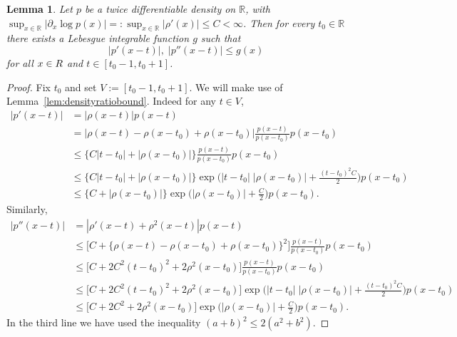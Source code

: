 \documentclass[aos]{imsart}
\newcommand{\R}{\mathbb{R}}
\newtheorem{lemma}[theorem]{Lemma}
\begin{document}
	\begin{lemma}
		\label{lem:pderivlocallybounded}
		Let $p$ be a twice differentiable density on $\R$, with $\sup_{x\in\R} |\partial_x \log p(x)| =: \sup_{x\in\R} |\rho'(x)|\leq C<\infty$. Then for every $t_0\in\R$ there exists a Lebesgue integrable function $g$ such that 
		\begin{equation*}
			|p'(x-t)|,\; |p''(x-t)| \leq g(x)
		\end{equation*}
		for all $x\in\mathcal\R$ and $t\in [t_0-1, t_0+1]$. 
	\end{lemma}
	\begin{proof}
		Fix $t_0$ and set $V:=[t_0-1, t_0+1]$. We will make use of Lemma~\ref{lem:densityratiobound}. Indeed for any $t\in V$, \begin{align*}
			|p'(x-t)| &= |\rho(x-t)| p(x-t)\\
			&=|\rho(x-t)-\rho(x-t_0)+\rho(x-t_0)| \frac{p(x-t)}{p(x-t_0)} p(x-t_0)\\
			&\leq \big\{C|t-t_0| + |\rho(x-t_0)|\big\} \frac{p(x-t)}{p(x-t_0)} p(x-t_0)\\
			&\leq \big\{C|t-t_0| + |\rho(x-t_0)|\big\} \exp\bigg(|t-t_0|\;|\rho(x-t_0)| + \frac{(t-t_0)^2C}{2}\bigg) p(x-t_0)\\
			&\leq \big\{C + |\rho(x-t_0)|\big\} \exp\bigg(|\rho(x-t_0)| + \frac{C}{2}\bigg) p(x-t_0).
		\end{align*}
		Similarly,
		\begin{align*}
			|p''(x-t)| &= |\rho'(x-t)+\rho^2(x-t)| p(x-t)\\
			&\leq \big[C + \{\rho(x-t)-\rho(x-t_0)+\rho(x-t_0)\}^2 \big]\frac{p(x-t)}{p(x-t_0)} p(x-t_0)\\
			&\leq \big[C + 2C^2(t-t_0)^2 + 2\rho^2(x-t_0) \big]\frac{p(x-t)}{p(x-t_0)} p(x-t_0)\\
			&\leq \big[C + 2C^2(t-t_0)^2 + 2\rho^2(x-t_0) \big] \exp\bigg(|t-t_0|\;|\rho(x-t_0)| + \frac{(t-t_0)^2C}{2}\bigg) p(x-t_0)\\
			&\leq \big[C + 2C^2 + 2\rho^2(x-t_0) \big] \exp\bigg(|\rho(x-t_0)| + \frac{C}{2}\bigg) p(x-t_0).
		\end{align*}
		In the third line we have used the inequality $(a+b)^2 \leq 2(a^2+b^2)$.
		

\end{proof}
\end{document}
